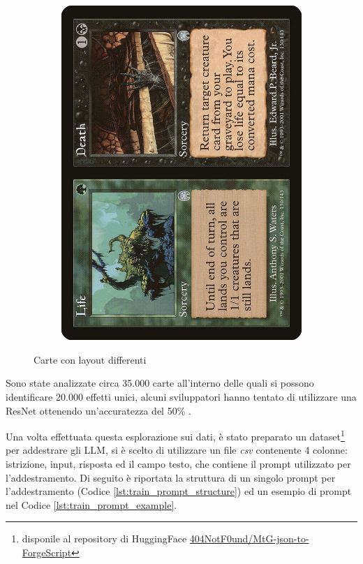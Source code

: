 \begin{figure}[ht]
\begin{subfigure}{0.25\textwidth}
		\includegraphics[width=1.0\textwidth]{Immagini/apc-130-life.jpg}
	\end{subfigure}
	\caption{Carte con layout differenti}
	\label{fig:mfc}
\end{figure}

Sono state analizzate circa 35.000 carte all'interno delle quali si possono identificare  20.000 effetti unici, alcuni sviluppatori hanno tentato di utilizzare una ResNet ottenendo un'accuratezza del 50\% \cite{forgescribe}.

Una volta effettuata questa esplorazione sui dati, è stato preparato un dataset\footnote{disponile al repository di HuggingFace \href{https://huggingface.co/datasets/404NotF0und/MtG-json-to-ForgeScript}{404NotF0und/MtG-json-to-ForgeScript}} per addestrare gli LLM, si è scelto di utilizzare un file \textit{csv} contenente 4 colonne: istrizione, input, risposta ed il campo testo, che  contiene il prompt utilizzato per l'addestramento. Di seguito è riportata la struttura di un singolo prompt per l'addestramento (Codice \ref{lst:train_prompt_structure}) ed un esempio di prompt nel Codice \ref{lst:train_prompt_example}.

